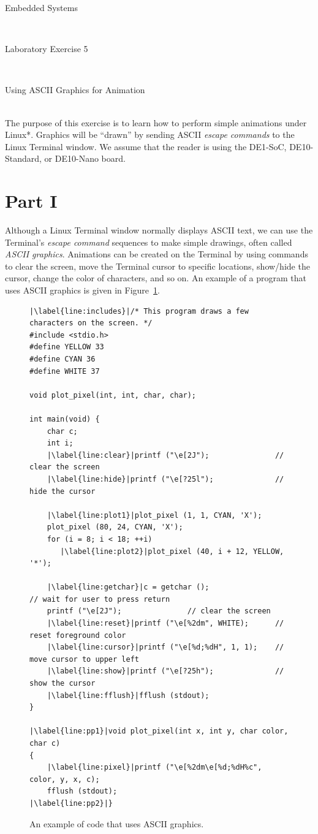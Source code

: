 \documentclass[epsfig,10pt,fullpage]{article}
\newcommand{\LabNum}{5}
\begin{document}
\centerline{\huge Embedded Systems}
~\\
\centerline{\huge Laboratory Exercise \LabNum}
~\\
\centerline{\large Using ASCII Graphics for Animation}
~\\

\noindent
The purpose of this exercise is to learn how to perform simple animations under Linux*. 
Graphics will be ``drawn'' by sending ASCII {\it escape commands} to the Linux Terminal window.
We assume that the reader is using the DE1-SoC, DE10-Standard, or DE10-Nano board.

\noindent
\section*{Part I}

\noindent
Although a Linux Terminal window normally displays ASCII text, we can use the 
Terminal's {\it escape command} sequences to make simple drawings, often called 
{\it ASCII graphics}. Animations can be created on the Terminal by using commands to 
clear the screen, move the Terminal cursor to specific locations, show/hide the cursor, 
change the color of characters, and so on. An example of a program that uses ASCII graphics is 
given in Figure~\ref{fig:dots}. 

\lstset{language=C,numbers=left,escapechar=|}
\begin{figure}[h]
\begin{center}
\begin{minipage}[t]{12.5 cm}
\begin{lstlisting}[name=dots]
|\label{line:includes}|/* This program draws a few characters on the screen. */
#include <stdio.h>
#define YELLOW 33
#define CYAN 36
#define WHITE 37

void plot_pixel(int, int, char, char);

int main(void) {
	char c;
	int i;
	|\label{line:clear}|printf ("\e[2J"); 				// clear the screen
  	|\label{line:hide}|printf ("\e[?25l");				// hide the cursor

	|\label{line:plot1}|plot_pixel (1, 1, CYAN, 'X');
	plot_pixel (80, 24, CYAN, 'X');
	for (i = 8; i < 18; ++i)
	   |\label{line:plot2}|plot_pixel (40, i + 12, YELLOW, '*');

	|\label{line:getchar}|c = getchar ();					// wait for user to press return
	printf ("\e[2J"); 				// clear the screen
	|\label{line:reset}|printf ("\e[%2dm", WHITE);		// reset foreground color
	|\label{line:cursor}|printf ("\e[%d;%dH", 1, 1);	// move cursor to upper left
	|\label{line:show}|printf ("\e[?25h");				// show the cursor
	|\label{line:fflush}|fflush (stdout);
}

|\label{line:pp1}|void plot_pixel(int x, int y, char color, char c)
{
  	|\label{line:pixel}|printf ("\e[%2dm\e[%d;%dH%c", color, y, x, c);
  	fflush (stdout);
|\label{line:pp2}|}
\end{lstlisting}
\end{minipage}
\caption{An example of code that uses ASCII graphics.}
\label{fig:dots}
\end{center}
\end{figure}
\end{document}
